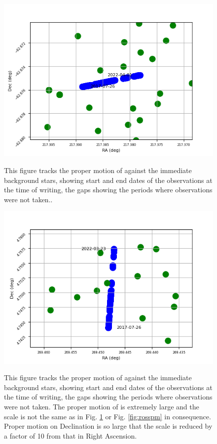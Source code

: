 \begin{figure}[!htbp]
\begin{center}
\includegraphics[scale=0.9]{images/pmprox.png} \\
\end{center}   
\caption{This figure tracks the proper motion of {\prox} against the immediate
background stars, showing start and end dates of the observations at the time
of writing, the gaps showing the periods where observations were not taken..} \protect\label{fig:proxpm}
\end{figure}

\begin{figure}[!htbp]
\begin{center}
\includegraphics[scale=1]{images/pmbstar.png} \\
\end{center}   
\caption{This figure tracks the proper motion of {\bstar} against the immediate
background stars, showing start and end dates of the observations at the time
of writing, the gaps showing the periods where observations were not taken. The proper motion of {\bstar} is
extremely large and the scale is not the same as in Fig. \ref{fig:proxpm} or
Fig.  \ref{fig:rosspm} in consequence. Proper motion on Declination is so large
that the scale is reduced by a factor of 10 from that in Right Ascension.} \protect\label{fig:bspm}
\end{figure}

